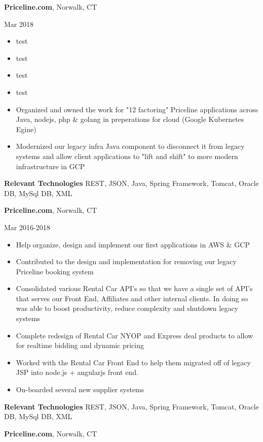 \documentclass[a4paper,online]{adcv}
\begin{document}
\begin{adcvtabletwo}
  {\textbf{Priceline.com}, Norwalk, CT}
  
   {Mar 2018}
  \begin{itemize}
    \item test
    \item test
    \item test
    \item test
    \item Organized and owned the work for "12 factoring" Priceline applications across Java, nodejs, php \& golang in preperations for cloud (Google Kubernetes Egine)
    \item Modernized our legacy infra Java component to disconnect it from legacy systems and allow client applications to "lift and shift" to more modern infrastructure in GCP
  \end{itemize}
  \adcvrowskip
    \adcvrowskip
  \textbf{Relevant Technologies} REST, JSON, Java, Spring Framework, Tomcat, Oracle DB, MySql DB, XML
  
  {\textbf{Priceline.com}, Norwalk, CT}
  
   {Mar 2016-2018}
  \begin{itemize}
    \item Help organize, design and implement our first applications in AWS \& GCP
    \item Contributed to the design and implementation for removing our legacy Priceline booking system
    \item Consolidated various Rental Car API's so that we have a single set of API's that serves our Front End, Affiliates and other internal clients. In doing so was able to boost productivity, reduce complexity and shutdown legacy systems
    \item Complete redesign of Rental Car NYOP and Express deal products to allow for realtime bidding and dynamic pricing
    \item Worked with the Rental Car Front End to help them migrated off of legacy JSP into node.js + angularjs front end.
    \item On-boarded several new supplier systems
  \end{itemize}
    \adcvrowskip
  \textbf{Relevant Technologies} REST, JSON, Java, Spring Framework, Tomcat, Oracle DB, MySql DB, XML
  
  \adcvrowskip
  {\textbf{Priceline.com}, Norwalk, CT}
  

\end{adcvtabletwo}
\end{document}

